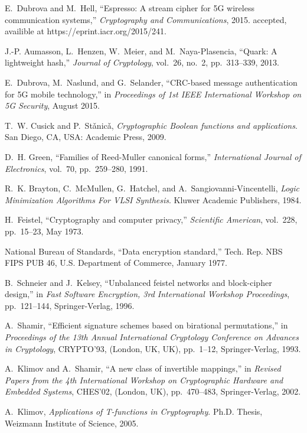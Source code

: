 \documentclass[9pt,conference]{IEEEtran} \usepackage{times}
\begin{document}
\begin{thebibliography}{10}
E.~Dubrova and M.~Hell, ``Espresso: A stream cipher for {5G} wireless
  communication systems,'' {\em Cryptography and Communications}, 2015.
\newblock accepted, availible at https://eprint.iacr.org/2015/241.

J.-P. Aumasson, L.~Henzen, W.~Meier, and M.~Naya-Plasencia, ``Quark: A
  lightweight hash,'' {\em Journal of Cryptology}, vol.~26, no.~2,
  pp.~313--339, 2013.

E.~Dubrova, M.~Naslund, and G.~Selander, ``{CRC}-based message authentication
  for {5G} mobile technology,'' in {\em Proceedings of 1st IEEE International
  Workshop on 5G Security}, August 2015.

T.~W. Cusick and P.~St{\v a}nic{\v a}, {\em Cryptographic {B}oolean functions
  and applications}.
\newblock San Diego, CA, USA: Academic Press, 2009.

D.~H. Green, ``Families of {R}eed-{M}uller canonical forms,'' {\em
  International Journal of Electronics}, vol.~70, pp.~259--280, 1991.

R.~K. Brayton, C.~McMullen, G.~Hatchel, and A.~Sangiovanni-Vincentelli, {\em
  Logic Minimization Algorithms For VLSI Synthesis}.
\newblock Kluwer Academic Publishers, 1984.

H.~Feistel, ``Cryptography and computer privacy,'' {\em Scientific American},
  vol.~228, pp.~15--23, May 1973.

{National Bureau of Standards}, ``Data encryption standard,'' Tech. Rep. NBS
  FIPS PUB 46, U.S. Department of Commerce, January 1977.

B.~Schneier and J.~Kelsey, ``Unbalanced feistel networks and block-cipher
  design,'' in {\em Fast Software Encryption, 3rd International Workshop
  Proceedings}, pp.~121--144, Springer-Verlag, 1996.

A.~Shamir, ``Efficient signature schemes based on birational permutations,'' in
  {\em Proceedings of the 13th Annual International Cryptology Conference on
  Advances in Cryptology}, CRYPTO'93, (London, UK, UK), pp.~1--12,
  Springer-Verlag, 1993.

A.~Klimov and A.~Shamir, ``A new class of invertible mappings,'' in {\em
  Revised Papers from the 4th International Workshop on Cryptographic Hardware
  and Embedded Systems}, CHES'02, (London, UK), pp.~470--483, Springer-Verlag,
  2002.

A.~Klimov, {\em Applications of T-functions in Cryptography}.
\newblock Ph.D. Thesis, Weizmann Institute of Science, 2005.


\end{thebibliography}
\end{document}
